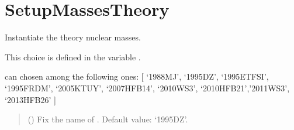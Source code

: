 \documentclass[letterpaper,10pt,english]{sphinxmanual}
\begin{document}
\section{SetupMassesTheory}
\label{\detokenize{source/api/setup_masses_theory:setupmassestheory}}\label{\detokenize{source/api/setup_masses_theory::doc}}\label{\detokenize{source/api/setup_masses_theory:module-nucleardatapy.setup_masses_theory}}

\begin{fulllineitems}
\label{\detokenize{source/api/setup_masses_theory:nucleardatapy.setup_masses_theory.SetupMassesTheory}}
\pysigstartsignatures
\pysiglinewithargsret
{}
{}
{}
\pysigstopsignatures
\sphinxAtStartPar
Instantiate the theory nuclear masses.

\sphinxAtStartPar
This choice is defined in the variable .

\sphinxAtStartPar
{} can chosen among the following ones:     {[} ‘1988\sphinxhyphen{}MJ’, ‘1995\sphinxhyphen{}DZ’, ‘1995\sphinxhyphen{}ETFSI’, ‘1995\sphinxhyphen{}FRDM’,     ‘2005\sphinxhyphen{}KTUY’, ‘2007\sphinxhyphen{}HFB14’, ‘2010\sphinxhyphen{}WS3’, ‘2010\sphinxhyphen{}HFB21’,’2011\sphinxhyphen{}WS3’, ‘2013\sphinxhyphen{}HFB26’ {]}
\begin{quote}\begin{description}
\sphinxAtStartPar
{} (\sphinxstyleliteralemphasis{\sphinxupquote{, }}) \textendash{} Fix the name of . Default value: ‘1995\sphinxhyphen{}DZ’.

\end{description}\end{quote}


\end{fulllineitems}
\end{document}
